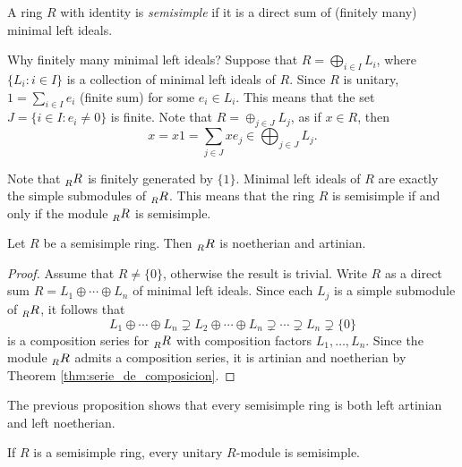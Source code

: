 \begin{definition}
    A ring $R$ with identity is \emph{semisimple} if it is a direct sum of (finitely many) 
    minimal left ideals. 
\end{definition}

Why finitely many minimal left ideals?
Suppose that $R=\bigoplus_{i\in I}L_i$, where $\{L_i:i\in I\}$ is a collection of
minimal left ideals of $R$. 
Since $R$ is unitary, $1=\sum_{i\in I}e_i$ (finite sum) for 
some $e_i\in L_i$. This means that the set $J=\{i\in I:e_i\ne 0\}$ is finite.
Note that $R=\oplus_{j\in J}L_j$, as 
if $x\in R$, then 
\[
x=x1=\sum_{j\in J}xe_j\in \bigoplus_{j\in J}L_j.
\]

Note
that $\prescript{}{R}{R}$ is finitely generated by $\{1\}$. Minimal left ideals of $R$ 
are exactly the simple submodules of $\prescript{}{R}{R}$. 
This means that 
the ring $R$ is semisimple if and only if the module
$\prescript{}{R}{R}$ is semisimple.  

\begin{proposition}
    Let $R$ be a semisimple ring. Then $\prescript{}{R}{R}$ is noetherian and artinian.
\end{proposition}

\begin{proof}
	Assume that $R\ne\{0\}$, otherwise the result is trivial. 
    Write $R$ as a direct sum $R=L_1\oplus\cdots\oplus L_n$ of minimal left ideals. Since 
    each $L_j$ is a simple submodule of $\prescript{}{R}{R}$, it follows that 
    \[
    L_1\oplus\cdots\oplus L_n\supsetneq L_2\oplus\cdots\oplus L_n\supsetneq\cdots\supsetneq L_n\supsetneq\{0\}
    \]
    is a composition series for $\prescript{}{R}{R}$ with composition factors
    $L_1,\dots,L_n$. Since the module $\prescript{}{R}{R}$ admits a composition
    series, it is artinian and noetherian by Theorem \ref{thm:serie_de_composicion}. 
\end{proof}

The previous proposition shows 
that every semisimple ring is both left artinian and left noetherian. 

\begin{exercise}
\label{xca:semisimple}
    If $R$ is a semisimple ring, every unitary $R$-module is semisimple. 
\end{exercise}



